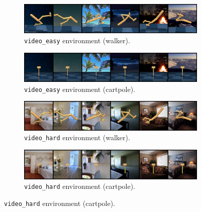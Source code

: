 \begin{figure}
    \begin{subfigure}[b]{0.48\textwidth}
        \centering
        \includegraphics[width=\textwidth]{figures/visualizations/obs_env_video_easy.png}
        \caption{\texttt{video\_easy} environment (walker).}
        \vspace{0.1in}
    \end{subfigure}
    \begin{subfigure}[b]{0.48\textwidth}
        \centering
        \includegraphics[width=\textwidth]{figures/visualizations/obs_cartpole_env_video_easy.png}
        \caption{\texttt{video\_easy} environment (cartpole).}
        \vspace{0.1in}
    \end{subfigure}
    \begin{subfigure}[b]{0.48\textwidth}
        \centering
        \includegraphics[width=\textwidth]{figures/visualizations/obs_env_video_hard.png}
        \caption{\texttt{video\_hard} environment (walker).}
        \vspace{0.1in}
    \end{subfigure}
    \begin{subfigure}[b]{0.48\textwidth}
        \centering
        \includegraphics[width=\textwidth]{figures/visualizations/obs_cartpole_env_video_hard.png}
        \caption{\texttt{video\_hard} environment (cartpole).}
        \vspace{0.1in}
    \end{subfigure}

\end{figure}
